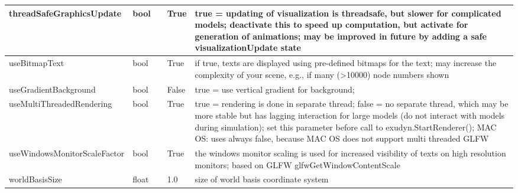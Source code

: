 \begin{center}
\begin{longtable}{| p{4.2cm} | p{2.5cm} | p{0.3cm} | p{3.0cm} | p{6cm} |}
    threadSafeGraphicsUpdate &     bool &      &     True &     true = updating of visualization is threadsafe, but slower for complicated models; deactivate this to speed up computation, but activate for generation of animations; may be improved in future by adding a safe visualizationUpdate state\\ \hline
    useBitmapText &     bool &      &     True &     if true, texts are displayed using pre-defined bitmaps for the text; may increase the complexity of your scene, e.g., if many (>10000) node numbers shown\\ \hline
    useGradientBackground &     bool &      &     False &     true = use vertical gradient for background; \\ \hline
    useMultiThreadedRendering &     bool &      &     True &     true = rendering is done in separate thread; false = no separate thread, which may be more stable but has lagging interaction for large models (do not interact with models during simulation); set this parameter before call to exudyn.StartRenderer(); MAC OS: uses always false, because MAC OS does not support multi threaded GLFW\\ \hline
    useWindowsMonitorScaleFactor &     bool &      &     True &     the windows monitor scaling is used for increased visibility of texts on high resolution monitors; based on GLFW glfwGetWindowContentScale\\ \hline
    worldBasisSize &     float &      &     1.0 &     size of world basis coordinate system\\ \hline
	  \end{longtable}
	\end{center}

